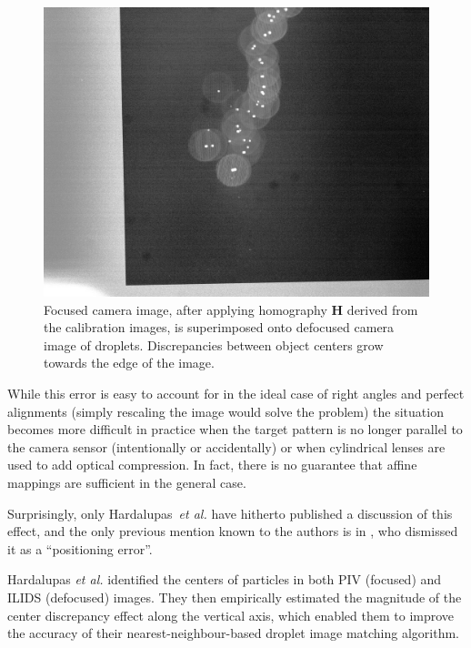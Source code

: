 \documentclass[11.5pt]{book}
\begin{document}
\begin{figure}
    \centering
    \includegraphics[height=0.45\textheight]{img/orb/drop-calibration-off.jpg}
    \caption{Focused camera image, after applying homography $\mathbf{H}$
        derived from the calibration images, is superimposed onto
    defocused camera image of droplets. Discrepancies between object centers
grow towards the edge of the image.}
    \label{fig:drop-calibration-off}
\end{figure}

While this error is easy to account for in the ideal case of right angles and
perfect alignments (simply rescaling the image would solve the problem) the
situation becomes more difficult in practice when the target pattern is no longer
parallel to the camera sensor (intentionally or accidentally) or when
cylindrical lenses are used to add optical compression. In fact, there is no
guarantee that affine mappings are sufficient in the general case.

Surprisingly, only Hardalupas~\emph{et al.} \cite{Hardalupas10, Hardalupas10a}
have hitherto published a discussion of this effect, and the only previous
mention known to the authors is in \citet{Kurosawa02}, who dismissed it as a
``positioning error''.

Hardalupas \emph{et al.} identified the centers of particles in both PIV
(focused) and ILIDS (defocused) images. They then empirically estimated the
magnitude of the center discrepancy effect along the vertical axis, which
enabled them to improve the accuracy of their nearest-neighbour-based droplet
image matching algorithm.
\end{document}
